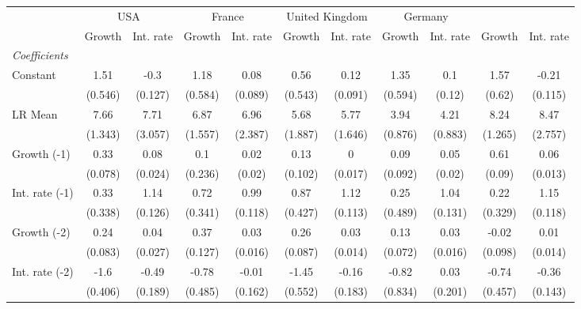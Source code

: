 \begin{table}[htbp] 
	\centering
	 \scriptsize
	\begin{tabular}{@{\extracolsep{4pt}}lcccccccccc@{}}		\hline\hline
		 		 & \multicolumn{2}{c}{USA} &\multicolumn{2}{c}{France} &\multicolumn{2}{c}{United Kingdom} &\multicolumn{2}{c}{Germany} \\ 
 		 & Growth 	 & Int. rate 	 & Growth 	 & Int. rate 	 & Growth 	 & Int. rate 	 & Growth 	 & Int. rate 	 & Growth 	 & Int. rate\\\cline{2-3}\cline{4-5}\cline{6-7}\cline{8-9}\cline{10-11}
\rule{0pt}{4ex} 
 \emph{Coefficients} 	  		 & 		 & 		 & 		 & 		 & 		 & 		 & 		 & 		 & 		 &\\ 
\quad Constant 	 & 1.51 	 & -0.3 	 & 1.18 	 & 0.08 	 & 0.56 	 & 0.12 	 & 1.35 	 & 0.1 	 & 1.57 	 & -0.21	 \\ 
 		 & (0.546) 	 & (0.127) 	 & (0.584) 	 & (0.089) 	 & (0.543) 	 & (0.091) 	 & (0.594) 	 & (0.12) 	 & (0.62) 	 & (0.115) 	 \\ 
\quad LR Mean 	 & 7.66 	 & 7.71 	 & 6.87 	 & 6.96 	 & 5.68 	 & 5.77 	 & 3.94 	 & 4.21 	 & 8.24 	 & 8.47	 \\ 
 		 & (1.343) 	 & (3.057) 	 & (1.557) 	 & (2.387) 	 & (1.887) 	 & (1.646) 	 & (0.876) 	 & (0.883) 	 & (1.265) 	 & (2.757) 	 \\ 
\quad Growth (-1) 	 &0.33 	 & 0.08 	 & 0.1 	 & 0.02 	 & 0.13 	 & 0 	 & 0.09 	 & 0.05 	 & 0.61 	 & 0.06	 \\ 
 		 & (0.078) 	 & (0.024) 	 & (0.236) 	 & (0.02) 	 & (0.102) 	 & (0.017) 	 & (0.092) 	 & (0.02) 	 & (0.09) 	 & (0.013) 	 \\ 
\quad Int. rate (-1) 	 &0.33 	 & 1.14 	 & 0.72 	 & 0.99 	 & 0.87 	 & 1.12 	 & 0.25 	 & 1.04 	 & 0.22 	 & 1.15	 \\ 
 		 & (0.338) 	 & (0.126) 	 & (0.341) 	 & (0.118) 	 & (0.427) 	 & (0.113) 	 & (0.489) 	 & (0.131) 	 & (0.329) 	 & (0.118) 	 \\ 
\quad Growth (-2) 	 &0.24 	 & 0.04 	 & 0.37 	 & 0.03 	 & 0.26 	 & 0.03 	 & 0.13 	 & 0.03 	 & -0.02 	 & 0.01	 \\ 
 		 & (0.083) 	 & (0.027) 	 & (0.127) 	 & (0.016) 	 & (0.087) 	 & (0.014) 	 & (0.072) 	 & (0.016) 	 & (0.098) 	 & (0.014) 	 \\ 
\quad Int. rate (-2) 	 &-1.6 	 & -0.49 	 & -0.78 	 & -0.01 	 & -1.45 	 & -0.16 	 & -0.82 	 & 0.03 	 & -0.74 	 & -0.36	 \\ 
 		 & (0.406) 	 & (0.189) 	 & (0.485) 	 & (0.162) 	 & (0.552) 	 & (0.183) 	 & (0.834) 	 & (0.201) 	 & (0.457) 	 & (0.143) 	 \\ 

\end{tabular}
\end{table}
